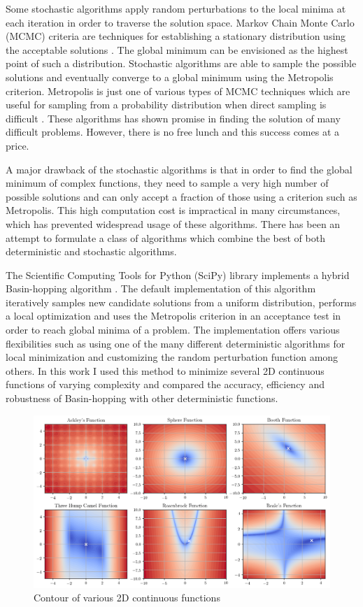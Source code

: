 \documentclass[conference]{IEEEtran}
\begin{document}
Some stochastic algorithms apply random perturbations to the local minima at each iteration in order to traverse the solution space. Markov Chain Monte Carlo (MCMC) criteria are techniques for establishing a stationary distribution using the acceptable solutions \cite{b4}. The global minimum can be envisioned as the highest point of such a distribution. Stochastic algorithms are able to sample the possible solutions and eventually converge to a global minimum using the Metropolis criterion. Metropolis is just one of various types of MCMC techniques which are useful for sampling from a probability distribution when direct sampling is difficult \cite{b12}. These algorithms has shown promise in finding the solution of many difficult problems. However, there is no free lunch and this success comes at a price.

A major drawback of the stochastic algorithms is that in order to find the global minimum of complex functions, they need to sample a very high number of possible solutions and can only accept a fraction of those using a criterion such as Metropolis. This high computation cost is impractical in many circumstances, which has prevented widespread usage of these algorithms. There has been an attempt to formulate a class of algorithms which combine the best of both deterministic and stochastic algorithms.

The Scientific Computing Tools for Python (SciPy) library implements a hybrid  Basin-hopping algorithm \cite{b5}. The default implementation of this algorithm iteratively samples new candidate solutions from a uniform distribution, performs a local optimization and uses the Metropolis criterion in an acceptance test in order to reach global minima of a problem. The implementation offers various flexibilities such as using one of the many different deterministic algorithms for local minimization and customizing the random perturbation function among others. In this work I used this method to minimize several 2D continuous functions of varying complexity and compared the accuracy, efficiency and robustness of Basin-hopping with other deterministic functions.

\begin{figure}[htbp]
\centerline{\includegraphics[width=.5\textwidth]{functions.png}}
\caption{Contour of various 2D continuous functions}
\label{functions}
\end{figure}
\end{document}
